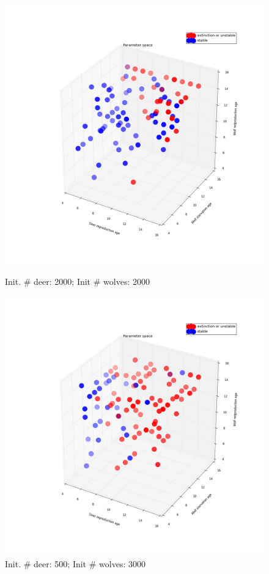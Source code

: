 \documentclass[a4paper,12pt]{article}
\begin{document}
  \begin{figure}[ht]
  \centering
                \begin{minipage}[b]{.45\linewidth}
                        \includegraphics[width = 1\linewidth]{./pics/Restricted_Parameter_space_d2000_w2000.png}
                    \caption{Init. $\#$ deer: 2000; Init $\#$ wolves: 2000}
                \end{minipage}
                \quad
                \begin{minipage}[b]{.45\linewidth}
                \includegraphics[width = 1\linewidth]{./pics/Restricted_Parameter_space_d500_w3000.png}
                \caption{Init. $\#$ deer: 500; Init $\#$ wolves: 3000}
                \end{minipage}
  \end{figure}
\end{document}
